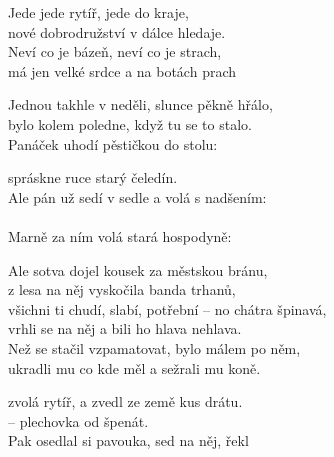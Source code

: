 
\cho{}
Jede jede rytíř, jede do kraje,\\
nové dobrodružství v dálce hledaje.\\
Neví co je bázeň, neví co je strach,\\
má jen velké srdce a na botách prach

\ve{}
Jednou takhle v neděli, slunce pěkně hřálo,\\
bylo kolem poledne, když tu se to stalo.\\
Panáček uhodí pěstičkou do stolu:\\

\cho{}

\ve{}
 spráskne ruce starý čeledín.\\
Ale pán už sedí v sedle a volá s nadšením:\\
\\
Marně za ním volá stará hospodyně:\\

\cho{}

\ve{}
Ale sotva dojel kousek za městskou bránu,\\
z lesa na něj vyskočila banda trhanů,\\
všichni ti chudí, slabí, potřební -- no chátra špinavá,\\
vrhli se na něj a bili ho hlava nehlava.\\
Než se stačil vzpamatovat, bylo málem po něm,\\
ukradli mu co kde měl a sežrali mu koně.

\cho{}

\ve{}
 zvolá rytíř,  a zvedl ze země kus drátu.\\
 -- plechovka od špenát.\\
Pak osedlal si pavouka, sed na něj, řekl 

